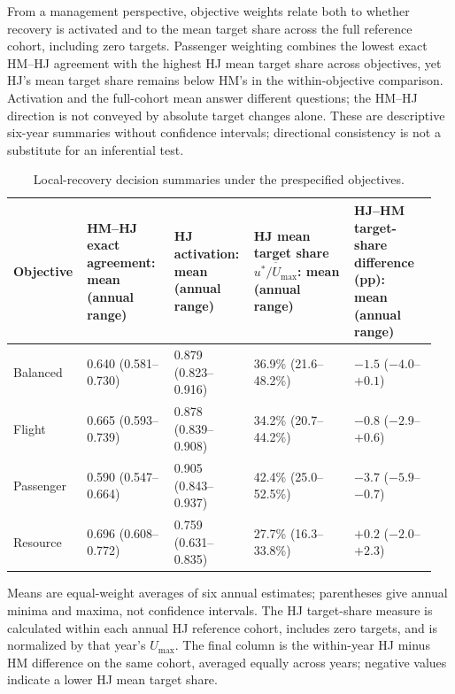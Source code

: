 From a management perspective, objective weights relate both to whether recovery is activated and to the mean target share across the full reference cohort, including zero targets. Passenger weighting combines the lowest exact HM--HJ agreement with the highest HJ mean target share across objectives, yet HJ's mean target share remains below HM's in the within-objective comparison. Activation and the full-cohort mean answer different questions; the HM--HJ direction is not conveyed by absolute target changes alone. These are descriptive six-year summaries without confidence intervals; directional consistency is not a substitute for an inferential test.

\begin{table}[pos=t]
\centering
\caption{Local-recovery decision summaries under the prespecified objectives.}
\label{tab:objective_summary_new}
\small
\setlength{\tabcolsep}{2pt}
\begin{tabular}{p{0.15\linewidth}p{0.20\linewidth}p{0.18\linewidth}p{0.23\linewidth}p{0.19\linewidth}}
\toprule
Objective & \shortstack{HM--HJ exact\\agreement: mean\\(annual range)} &
\shortstack{HJ activation:\\mean\\(annual range)} &
\shortstack{HJ mean target share\\$\overline{u^*/U_{\max}}$:\\mean (annual range)} &
\shortstack{HJ--HM target-share\\difference (pp):\\mean (annual range)} \\
\midrule
Balanced & 0.640 (0.581--0.730) & 0.879 (0.823--0.916) & 36.9\% (21.6--48.2\%) & $-1.5$ ($-4.0$--$+0.1$) \\
Flight & 0.665 (0.593--0.739) & 0.878 (0.839--0.908) & 34.2\% (20.7--44.2\%) & $-0.8$ ($-2.9$--$+0.6$) \\
Passenger & 0.590 (0.547--0.664) & 0.905 (0.843--0.937) & 42.4\% (25.0--52.5\%) & $-3.7$ ($-5.9$--$-0.7$) \\
Resource & 0.696 (0.608--0.772) & 0.759 (0.631--0.835) & 27.7\% (16.3--33.8\%) & $+0.2$ ($-2.0$--$+2.3$) \\
\bottomrule
\end{tabular}
\par\vspace{3pt}
\begin{minipage}{0.98\linewidth}
\footnotesize
Means are equal-weight averages of six annual estimates; parentheses give annual minima and maxima, not confidence intervals. The HJ target-share measure is calculated within each annual HJ reference cohort, includes zero targets, and is normalized by that year's $U_{\max}$. The final column is the within-year HJ minus HM difference on the same cohort, averaged equally across years; negative values indicate a lower HJ mean target share.
\end{minipage}
\end{table}

